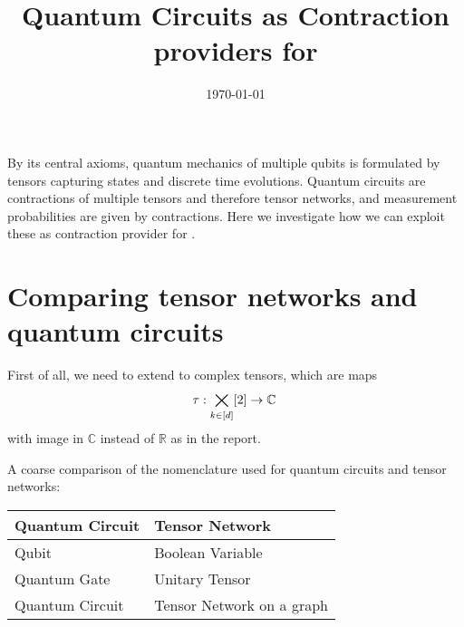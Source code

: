 \documentclass[aps,onecolumn,nofootinbib,pra]{article}
\begin{document}
    \title{Quantum Circuits as Contraction providers for \tnreason}

    \maketitle
    \date{\today}

    By its central axioms, quantum mechanics of multiple qubits is formulated by tensors capturing states and discrete time evolutions.
    Quantum circuits are contractions of multiple tensors and therefore tensor networks, and measurement probabilities are given by contractions.
    Here we investigate how we can exploit these as contraction provider for \tnreason.


    \section{Comparing tensor networks and quantum circuits}

    First of all, we need to extend to complex tensors, which are maps
    \begin{align*}
        \tau : \bigtimes_{k\in[d]}[2] \rightarrow \mathbb{C} \,
    \end{align*}
    with image in $\mathbb{C}$ instead of $\mathbb{R}$ as in the report.

    A coarse comparison of the nomenclature used for quantum circuits and tensor networks:

    \begin{center}
        \begin{tabular}{l|l}
            \textbf{Quantum Circuit} & \textbf{Tensor Network}   \\
            \hline
            Qubit                    & Boolean Variable          \\
            Quantum Gate             & Unitary Tensor            \\
            Quantum Circuit          & Tensor Network on a graph
        \end{tabular}
    \end{center}
\end{document}
